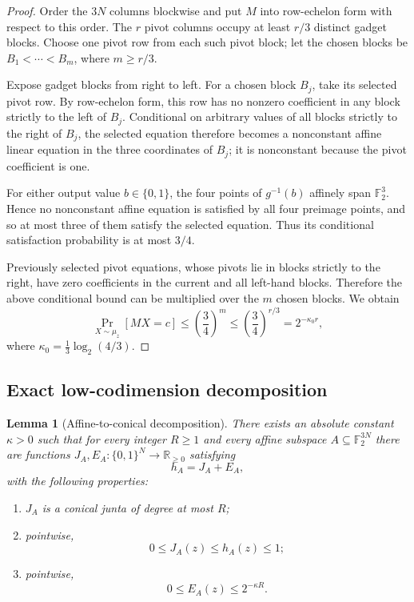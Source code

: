\documentclass[11pt]{article}
\newtheorem{lemma}[theorem]{Lemma}
\theoremstyle{definition}
\newcommand{\F}{\mathbb F}
\newcommand{\bits}{\{0,1\}}
\newcommand{\Prb}{\mathop{\Pr}}
\begin{document}
\begin{proof}
Order the $3N$ columns blockwise and put $M$ into row-echelon form with respect to
this order.  The $r$ pivot columns occupy at least $r/3$ distinct gadget blocks.
Choose one pivot row from each such pivot block; let the chosen blocks be
$B_1<\cdots<B_m$, where $m\ge r/3$.

Expose gadget blocks from right to left.  For a chosen block $B_j$, take its selected
pivot row.  By row-echelon form, this row has no nonzero coefficient in any block
strictly to the left of $B_j$.  Conditional on arbitrary values of all blocks strictly
to the right of $B_j$, the selected equation therefore becomes a nonconstant affine
linear equation in the three coordinates of $B_j$; it is nonconstant because the
pivot coefficient is one.

For either output value $b\in\{0,1\}$, the four points of $g^{-1}(b)$ affinely span
$\mathbb F_2^3$.  Hence no nonconstant affine equation is satisfied by all four preimage
points, and so at most three of them satisfy the selected equation.  Thus its
conditional satisfaction probability is at most $3/4$.

Previously selected pivot equations, whose pivots lie in blocks strictly to the right,
have zero coefficients in the current and all left-hand blocks.  Therefore the above
conditional bound can be multiplied over the $m$ chosen blocks.  We obtain
\[
  \Prb_{X\sim\mu_z}[MX=c]
  \le
  \left(\frac34\right)^m
  \le
  \left(\frac34\right)^{r/3}
  =2^{-\kappa_0r},
\]
where $\kappa_0=\frac13\log_2(4/3)$.
\end{proof}

\subsection{Exact low-codimension decomposition}

\begin{lemma}[Affine-to-conical decomposition]\label{lem:affine-conical}
There exists an absolute constant $\kappa>0$ such that for every integer $R\ge1$
and every affine subspace $A\subseteq\F_2^{3N}$ there are functions
$J_A,E_A:\bits^N\to\mathbb R_{\ge0}$ satisfying
\[
  h_A=J_A+E_A,
  \tag{4.2}\label{eq:decomp}
\]
with the following properties:
\begin{enumerate}[label=(\roman*)]
\item $J_A$ is a conical junta of degree at most $R$;
\item pointwise,
\[
  0\le J_A(z)\le h_A(z)\le1;
\]
\item pointwise,
\[
  0\le E_A(z)\le 2^{-\kappa R}.
  \tag{4.3}\label{eq:error}
\]
\end{enumerate}
\end{lemma}
\end{document}
